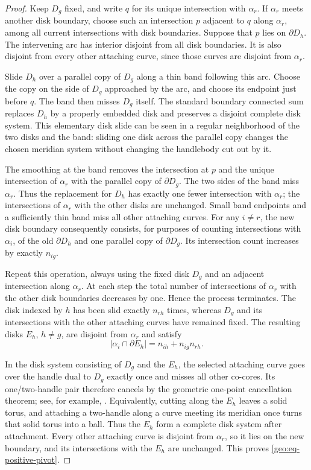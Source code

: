 \begin{proof}
Keep $D_g$ fixed, and write $q$ for its unique intersection with
$\alpha_r$.  If $\alpha_r$ meets another disk boundary, choose such an
intersection $p$ adjacent to $q$ along $\alpha_r$, among all current
intersections with disk boundaries.  Suppose that $p$ lies on
$\partial D_h$.  The intervening arc has interior disjoint from all disk
boundaries.  It is also disjoint from every other attaching curve, since
those curves are disjoint from $\alpha_r$.

Slide $D_h$ over a parallel copy of $D_g$ along a thin band following this
arc.  Choose the copy on the side of $D_g$ approached by the arc, and choose
its endpoint just before $q$.  The band then misses $D_g$ itself.  The
standard boundary connected sum replaces $D_h$ by a properly embedded disk
and preserves a disjoint complete disk system.  This elementary disk slide
can be seen in a regular neighborhood of the two disks and the band:
sliding one disk across the parallel copy changes the chosen meridian
system without changing the handlebody cut out by it.

The smoothing at the band removes the intersection at $p$ and the unique
intersection of $\alpha_r$ with the parallel copy of $\partial D_g$.
The two sides of the band miss $\alpha_r$.  Thus the replacement for $D_h$
has exactly one fewer intersection with $\alpha_r$; the intersections of
$\alpha_r$ with the other disks are unchanged.  Small band endpoints and a
sufficiently thin band miss all other attaching curves.  For any $i\ne r$,
the new disk boundary consequently consists, for purposes of counting
intersections with $\alpha_i$, of the old $\partial D_h$ and one parallel
copy of $\partial D_g$.  Its intersection count increases by exactly
$n_{ig}$.

Repeat this operation, always using the fixed disk $D_g$ and an adjacent
intersection along $\alpha_r$.  At each step the total number of
intersections of $\alpha_r$ with the other disk boundaries decreases by
one.  Hence the process terminates.  The disk indexed by $h$ has been slid
exactly $n_{rh}$ times, whereas $D_g$ and its intersections with the other
attaching curves have remained fixed.  The resulting disks $E_h$, $h\ne
g$, are disjoint from $\alpha_r$ and satisfy
\[
 |\alpha_i\cap\partial E_h|=n_{ih}+n_{ig}n_{rh}.
\]

In the disk system consisting of $D_g$ and the $E_h$, the selected
attaching curve goes over the handle dual to $D_g$ exactly once and misses
all other co-cores.  Its one/two-handle pair therefore cancels by the
geometric one-point cancellation theorem; see, for example,
\cite[Section~10.1.3, Lemma~10.3]{SadykovNotes}.  Equivalently, cutting along
the $E_h$ leaves a solid torus, and attaching a two-handle along a curve
meeting its meridian once turns that solid torus into a ball.  Thus the
$E_h$ form a complete disk system after attachment.  Every other attaching
curve is disjoint from $\alpha_r$, so it lies on the new boundary, and its
intersections with the $E_h$ are unchanged.  This proves
\eqref{geo:eq-positive-pivot}.
\end{proof}

